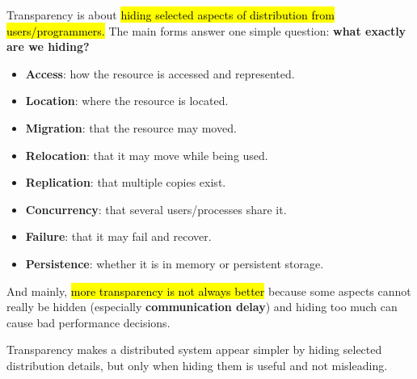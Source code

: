 \highspace
\begin{takeawaysbox}
    Transparency is about \hl{hiding selected aspects of distribution from users/programmers.} The main forms answer one simple question: \textbf{what exactly are we hiding?}
    \begin{itemize}
        \item \textbf{Access}: how the resource is accessed and represented.
        \item \textbf{Location}: where the resource is located.
        \item \textbf{Migration}: that the resource may moved.
        \item \textbf{Relocation}: that it may move while being used.
        \item \textbf{Replication}: that multiple copies exist.
        \item \textbf{Concurrency}: that several users/processes share it.
        \item \textbf{Failure}: that it may fail and recover.
        \item \textbf{Persistence}: whether it is in memory or persistent storage.
    \end{itemize}
    And mainly, \hl{more transparency is not always better} because some aspects cannot really be hidden (especially \textbf{communication delay}) and hiding too much can cause bad performance decisions.

    \highspace
    Transparency makes a distributed system appear simpler by hiding selected distribution details, but only when hiding them is useful and not misleading.
\end{takeawaysbox}